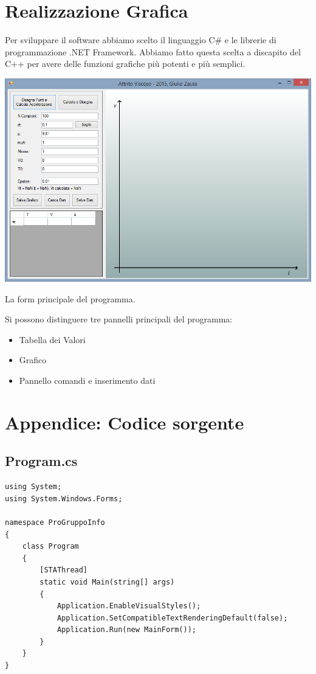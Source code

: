 \documentclass[11pt]{article} %
\begin{document}
\section{Realizzazione Grafica}
Per sviluppare il software abbiamo scelto il linguaggio C\# e le librerie di programmazione .NET Framework. Abbiamo fatto questa scelta a discapito del C++ per avere delle funzioni grafiche più potenti e più semplici.\par
\begin{center}\includegraphics[scale=0.6]{screen.png}\par La form principale del programma.\end{center}
Si possono distinguere tre pannelli principali del programma:
\begin{itemize}
  \item Tabella dei Valori
  \item Grafico
  \item Pannello comandi e inserimento dati
\end{itemize}
\newpage
\section{Appendice: Codice sorgente}
\subsection{Program.cs}
\begin{lstlisting}
using System;
using System.Windows.Forms;

namespace ProGruppoInfo
{
    class Program
    {
        [STAThread]
        static void Main(string[] args)
        {
            Application.EnableVisualStyles();
            Application.SetCompatibleTextRenderingDefault(false);
            Application.Run(new MainForm());
        }
    }
}
\end{lstlisting}
\end{document}
